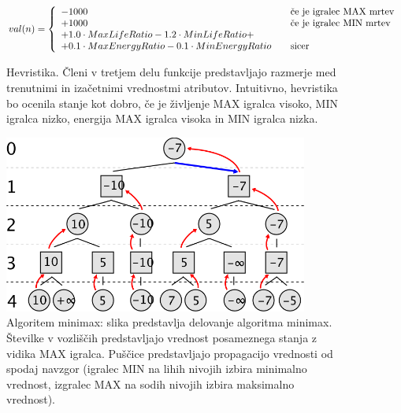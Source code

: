 \documentclass[12pt,a4paper,openany]{book}
\begin{document}
\begin{figure}[ht]
\centering

\[
  val(n) = \left\{ 
  \begin{array}{l l}
    -1000 & \quad \textrm{če je igralec MAX mrtev}\\
    +1000 & \quad \textrm{če je igralec MIN mrtev}\\
    +1.0\cdot MaxLifeRatio-1.2\cdot MinLifeRatio+ \\+0.1
 \cdot MaxEnergyRatio -0.1\cdot MinEnergyRatio & \quad \textrm{sicer}\\
  \end{array} \right.
\]
\caption[Hevristika]{Hevristika. Členi v tretjem delu funkcije predstavljajo razmerje med trenutnimi in izačetnimi vrednostmi atributov. Intuitivno, hevristika bo ocenila stanje kot dobro, če je življenje MAX igralca visoko, MIN igralca nizko, energija MAX igralca visoka in MIN igralca nizka.}
\label{eq:hevristika}
\end{figure}


\begin{figure}[ht]
 \centering
 \includegraphics[width=10cm]{svg2raster.png}
 \caption[Algoritem Minimax]{Algoritem minimax: slika predstavlja delovanje algoritma minimax. Številke v vozliščih predstavljajo vrednost posameznega stanja z vidika MAX igralca. Puščice predstavljajo propagacijo vrednosti od spodaj navzgor (igralec MIN na lihih nivojih izbira minimalno vrednost, izgralec MAX na sodih nivojih izbira maksimalno vrednost).}
 \label{fig:minimax}
\end{figure}
\end{document}
